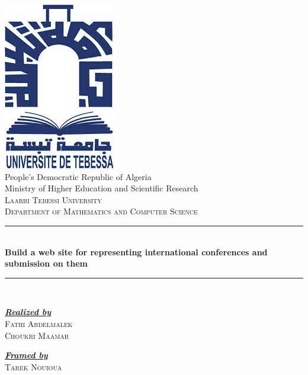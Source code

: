 \begin{titlepage}
	\begin{center}
		\includegraphics[]{./pics/univ-tebessa.jpg}\\[1cm]
		People's Democratic Republic of Algeria\\
		Ministry of Higher Education and Scientific Research\\[0.4cm]
		\textsc{\LARGE Laarbi Tebessi University}\\[0.4cm]
		\textsc{\large Department of Mathematics and Computer Science}\\[0.5cm]
		\hrule \\[0.4cm]		
		{\huge \bfseries Build a web site for representing international conferences and submission on them \\[1cm] }
		\hrule \\[1.5cm]
		\begin{minipage}{0.4\textwidth}
			\begin{flushleft} \large
				\emph{\textbf{\underline{Realized by}}}\\
				\textsc{Fathi Abdelmalek}\\
				\textsc{Choukri Maamar}
			\end{flushleft}
		\end{minipage}
		\begin{minipage}{0.4\textwidth}
			\begin{flushright} \large
				\emph{\textbf{\underline{Framed by}}} \\
				\textsc{Tarek Nouioua}
			\end{flushright}
		\end{minipage}
		\vfill
	\end{center}
\end{titlepage}